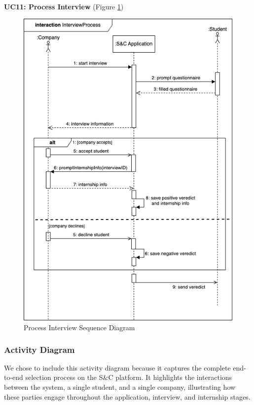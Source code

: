 \textbf{UC11: Process Interview} (Figure \ref{fig:process_sequence})
\begin{figure}[H]
\centering
\includegraphics[width=\textwidth]{Images/interviewProcess-sequence.png}
\caption{\label{fig:process_sequence} Process Interview Sequence Diagram}
\end{figure}

\subsubsection{Activity Diagram}
We chose to include this activity diagram because it captures the complete end-to-end selection process on the S\&C platform. It highlights the interactions between the system, a single student, and a single company, illustrating how these parties engage throughout the application, interview, and internship stages.


